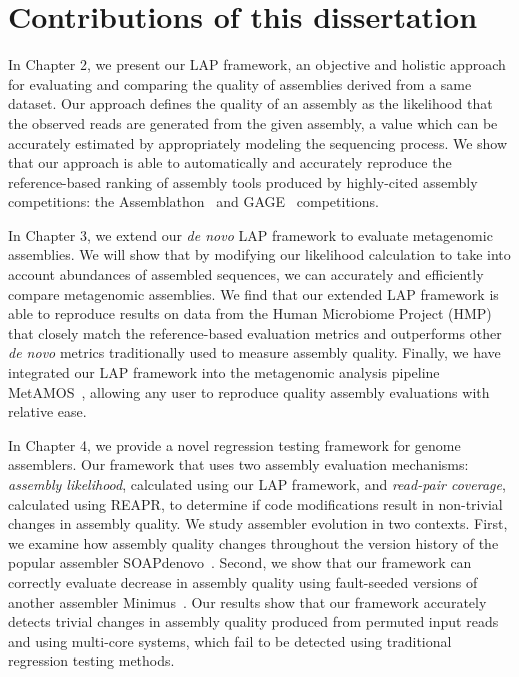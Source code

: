 \section{Contributions of this dissertation}

In Chapter 2, we present our LAP framework, an objective and holistic approach for evaluating and
comparing the quality of assemblies derived from a same dataset.  Our
approach defines the quality of an assembly as the likelihood that the
observed reads are generated from the given assembly, a value which can
be accurately estimated by appropriately modeling the sequencing
process. We show that our approach is able to automatically and accurately reproduce the
reference-based ranking of assembly tools produced by highly-cited assembly competitions: the
Assemblathon~\cite{earl2011assemblathon} and GAGE~\cite{salzberg2011gage}
competitions.

In Chapter 3, we extend our \emph{de novo} LAP framework to evaluate metagenomic assemblies.
We will show that by modifying our likelihood calculation to take into account abundances of assembled sequences, we can accurately and efficiently compare metagenomic assemblies.
We find that our extended LAP framework is able to reproduce results on data from the Human Microbiome Project (HMP)~\cite{mitreva2012structure,methe2012framework} that closely match the reference-based evaluation metrics and outperforms other \emph{de novo} metrics traditionally used to measure assembly quality.
Finally, we have integrated our LAP framework into the metagenomic analysis pipeline MetAMOS~\cite{treangen2013metamos}, allowing any user to reproduce quality assembly evaluations with relative ease.

In Chapter 4, we provide a novel regression testing framework for genome assemblers.
Our framework that uses two assembly evaluation mechanisms: \emph{assembly likelihood}, calculated using our LAP framework\cite{LAP}, and \emph{read-pair coverage}, calculated using REAPR\cite{hunt2013reapr}, to determine if code modifications result in non-trivial
changes in assembly quality.
We study assembler evolution in two contexts. First,
we examine how assembly quality changes
throughout the version history of the popular assembler SOAPdenovo~\cite{luo2012soapdenovo2}. Second,
we show that our framework can correctly evaluate decrease in assembly quality
using fault-seeded versions of another assembler Minimus~\cite{sommer2007minimus}.
Our results show that our framework accurately detects trivial
changes in assembly quality produced from permuted input reads and using
multi-core systems, which fail to be detected using traditional regression
testing methods.

